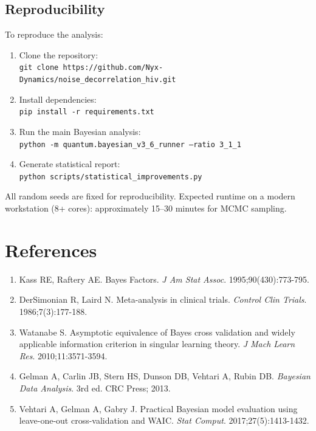 \documentclass[11pt]{article}
\begin{document}
\subsection{Reproducibility}

To reproduce the analysis:

\begin{enumerate}
    \item Clone the repository: \\
    \texttt{git clone https://github.com/Nyx-Dynamics/noise\_decorrelation\_hiv.git}

    \item Install dependencies: \\
    \texttt{pip install -r requirements.txt}

    \item Run the main Bayesian analysis: \\
    \texttt{python -m quantum.bayesian\_v3\_6\_runner --ratio 3\_1\_1}

    \item Generate statistical report: \\
    \texttt{python scripts/statistical\_improvements.py}
\end{enumerate}

All random seeds are fixed for reproducibility. Expected runtime on a modern workstation (8+ cores): approximately 15--30 minutes for MCMC sampling.

\newpage
\section*{References}

\begin{enumerate}
    \item Kass RE, Raftery AE. Bayes Factors. \textit{J Am Stat Assoc}. 1995;90(430):773-795.
    \item DerSimonian R, Laird N. Meta-analysis in clinical trials. \textit{Control Clin Trials}. 1986;7(3):177-188.
    \item Watanabe S. Asymptotic equivalence of Bayes cross validation and widely applicable information criterion in singular learning theory. \textit{J Mach Learn Res}. 2010;11:3571-3594.
    \item Gelman A, Carlin JB, Stern HS, Dunson DB, Vehtari A, Rubin DB. \textit{Bayesian Data Analysis}. 3rd ed. CRC Press; 2013.
    \item Vehtari A, Gelman A, Gabry J. Practical Bayesian model evaluation using leave-one-out cross-validation and WAIC. \textit{Stat Comput}. 2017;27(5):1413-1432.
\end{enumerate}
\end{document}
